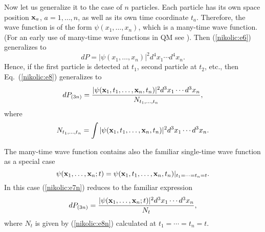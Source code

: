 \documentclass[12pt,twoside]{report} %
\begin{document}
Now let us generalize it to the case of $n$ particles.
Each particle has its own space 
position ${\bf x}_a$, $a=1,\ldots,n$, as well as its own time coordinate
$t_a$. Therefore, the wave function is of the form $\psi(x_1,\ldots,x_n)$,
which is a many-time wave function. (For an early use of many-time
wave functions in QM see \cite{tomon}). 
Then (\ref{nikolic:e6}) generalizes to
\begin{equation}\label{nikolic:e6n}
dP=|\psi(x_1,\ldots,x_n)|^2 d^4x_1 \cdots d^4x_n .
\end{equation}
Hence, if the first particle is detected at $t_1$, second particle at $t_2$, etc., 
then Eq.~(\ref{nikolic:e8}) generalizes to
\begin{equation}\label{nikolic:e7n}
dP_{(3n)}=\frac{|\psi({\bf x}_1,t_1,\ldots,{\bf x}_n,t_n)|^2 d^3x_1 \cdots d^3x_n}
{N_{t_1,\ldots,t_n}} ,
\end{equation}
where 
\begin{equation}\label{nikolic:e8n}
N_{t_1,\ldots,t_n}=\int |\psi({\bf x}_1,t_1,\ldots,{\bf x}_n,t_n)|^2 d^3x_1 \cdots d^3x_n .
\end{equation}

The many-time wave function contains also the
familiar single-time wave function as a special case
\begin{equation}\label{nikolic:stime}
 \psi({\bf x}_1,\ldots,{\bf x}_n;t)=\psi({\bf x}_1,t_1,\ldots,{\bf x}_n,t_n) 
|_{t_1=\cdots=t_n=t} .
\end{equation}
In this case  (\ref{nikolic:e7n}) reduces to the familiar expression
\begin{equation}\label{nikolic:e7ns}
dP_{(3n)}=\frac{|\psi({\bf x}_1,\ldots,{\bf x}_n;t)|^2 d^3x_1 \cdots d^3x_n}
{N_{t}} ,
\end{equation}
where $N_{t}$ is given by (\ref{nikolic:e8n}) calculated at $t_1=\cdots=t_n=t$.
\end{document}
